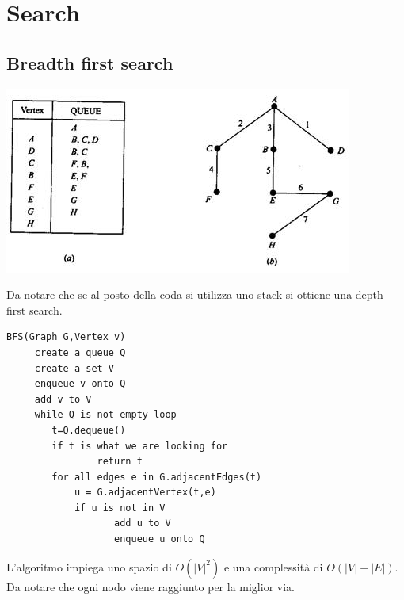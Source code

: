\documentclass[a4paper]{book}
\begin{document}
\section{Search}
\subsection{Breadth first search}
\begin{center}
\includegraphics[scale=1]{Figures/bfs.JPG}
\end{center}
Da notare che se al posto della coda si utilizza uno stack si ottiene una depth first search.
\begin{lstlisting}
BFS(Graph G,Vertex v)
     create a queue Q
     create a set V
     enqueue v onto Q
     add v to V
     while Q is not empty loop
     	t=Q.dequeue()
       	if t is what we are looking for 
            	return t
     	for all edges e in G.adjacentEdges(t)
			u = G.adjacentVertex(t,e)
           	if u is not in V
            	   add u to V
            	   enqueue u onto Q           
\end{lstlisting}
L'algoritmo impiega uno spazio di $O(|V|^2)$ e una complessità di $O(|V|+|E|)$. Da notare che ogni nodo viene raggiunto per la miglior via.
\end{document}
